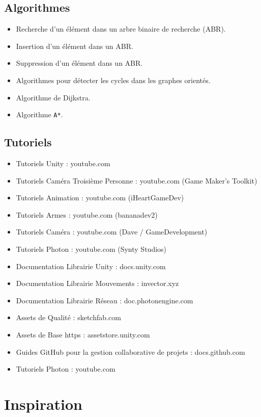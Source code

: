 \documentclass{report}
\begin{document}
\subsection{Algorithmes}
\begin{itemize}
    \item Recherche d'un élément dans un arbre binaire de recherche (ABR).
    \item Insertion d'un élément dans un ABR.
    \item Suppression d'un élément dans un ABR.
    \item Algorithmes pour détecter les cycles dans les graphes orientés.
    \item Algorithme de Dijkstra.
    \item Algorithme \texttt{A*}.
\end{itemize}

\subsection{Tutoriels}
\begin{itemize}
    \item Tutoriels Unity : youtube.com
    \item Tutoriels Caméra Troisième Personne : youtube.com (Game Maker's Toolkit)
    \item Tutoriels Animation : youtube.com (iHeartGameDev)
    \item Tutoriels Armes : youtube.com (bananadev2)
    \item Tutoriels Caméra : youtube.com (Dave / GameDevelopment)
    \item Tutoriels Photon : youtube.com (Synty Studios)
    \item Documentation Librairie Unity : docs.unity.com 
    \item Documentation Librairie Mouvements : invector.xyz
    \item Documentation Librairie Réseau : doc.photonengine.com
    \item Assets de Qualité : sketchfab.com
    \item Assets de Base https : assetstore.unity.com
    \item Guides GitHub pour la gestion collaborative de projets : docs.github.com
    \item Tutoriels Photon : youtube.com
\end{itemize}

\newpage
\section{Inspiration}
\end{document}

